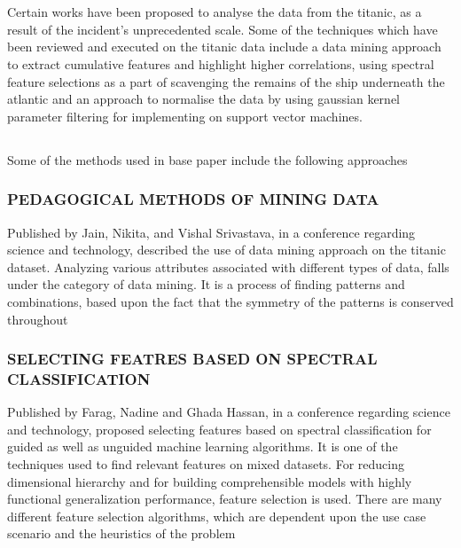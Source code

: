 \documentclass[12pt]{article}
\newcommand{\secsize}{\fontsize{15pt}{12pt}\selectfont}
\newcommand{\subsize}{\fontsize{14pt}{12pt}\selectfont}
\begin{document}
\section{\textbf{\secsize{LITERATURE REVIEW}}}
Certain works have been proposed to analyse the data from the titanic, as a result of the incident's unprecedented scale.  Some of the techniques which have been reviewed and executed on the titanic data include a data mining approach to extract cumulative features and highlight higher correlations, using spectral feature selections as a part of scavenging the remains of the ship underneath the atlantic and an approach to normalise the data by using gaussian kernel parameter filtering for implementing on support vector machines. 

\newpage

\subsection{\textbf{\subsize{METHODS USED IN BASE PAPER}}}
Some of the methods used in base paper include the following approaches 

\subsubsection{\textbf{PEDAGOGICAL METHODS OF MINING DATA}}
Published by Jain, Nikita, and Vishal Srivastava, in a conference regarding science and technology, described the use of data mining approach on the titanic dataset. Analyzing various attributes associated with different types of data, falls under the category of data mining. It is a process of finding patterns and combinations, based upon the fact that the symmetry of the patterns is conserved throughout 

\subsubsection{\textbf{SELECTING FEATRES BASED ON SPECTRAL CLASSIFICATION}}
Published by Farag, Nadine and Ghada Hassan, in a conference regarding science and technology, proposed selecting features based on spectral classification for guided as well as unguided machine learning algorithms. It is one of the techniques used to find relevant features on mixed datasets. For reducing dimensional  hierarchy and for building comprehensible models with highly functional generalization performance, feature selection is used. There are many different feature selection algorithms, which are dependent upon the use case scenario and the heuristics of the problem 
\end{document}

